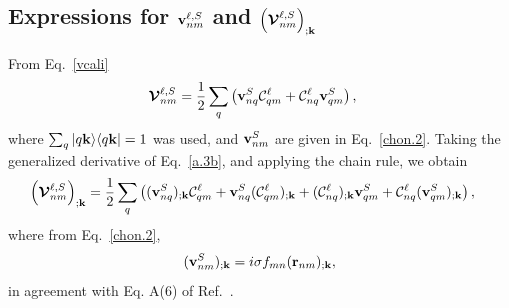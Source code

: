 \documentclass[floatfix,prb,aps,superscriptaddress,11pt,preprint,letterpaper]{revtex4}
\begin{document}
\subsection{Expressions for  \texorpdfstring{$\mathbf{v}^{\ell,S}_{nm}$}{Vnm}
and
\texorpdfstring{$\Big({\boldsymbol{\mathcal{\cal V}}}^{\ell,S}_{nm}\Big)_{;\mathbf{k}}$}{(Vnm);kb}
}\label{calvs} 
From Eq.~\eqref{vcali}
\begin{align}\label{a.3b}
\boldsymbol{\mathcal{\cal V}}^{\ell,S}_{nm}
&=
\frac{1}{2}\sum_q\left(   
\mathbf{v}^S_{nq}{\mathbf{\cal C}}^\ell_{qm}+{\mathbf{\cal C}}^\ell_{nq}\mathbf{v}^S_{qm}
\right)  
,
\end{align}    
where $\sum_q| q\mathbf{k} \rangle\langle q\mathbf{k} |=1$ was used,
and $\mathbf{v}^S_{nm}$ are given in Eq.~\eqref{chon.2}.
Taking the generalized derivative of Eq.~\eqref{a.3b}, and applying
the chain rule, we obtain
\begin{align}\label{a.3bn}
\left(\boldsymbol{\mathcal{\cal V}}^{\ell,S}_{nm}\right)_{;\mathbf{k}}
&=
\frac{1}{2}\sum_q\left(
(\mathbf{v}^S_{nq})_{;\mathbf{k}}{\mathbf{\cal C}}^\ell_{qm}
+    
\mathbf{v}^S_{nq}({\mathbf{\cal C}}^\ell_{qm})_{;\mathbf{k}}
+
({\mathbf{\cal C}}^\ell_{nq})_{;\mathbf{k}} \mathbf{v}^S_{qm}
+
{\mathbf{\cal C}}^\ell_{nq} (\mathbf{v}^S_{qm})_{;\mathbf{k}}
\right)  
,
\end{align}    
where from 
Eq.~\eqref{chon.2}, 
\begin{align}\label{choni.1}
(\mathbf{v}^S_{nm})_{;\mathbf{k}}=i\sigma f_{mn}
(\mathbf{r}_{nm})_{;\mathbf{k}}
,
\end{align}
in agreement with Eq. A(6) of Ref.~.

% 
\end{document}
